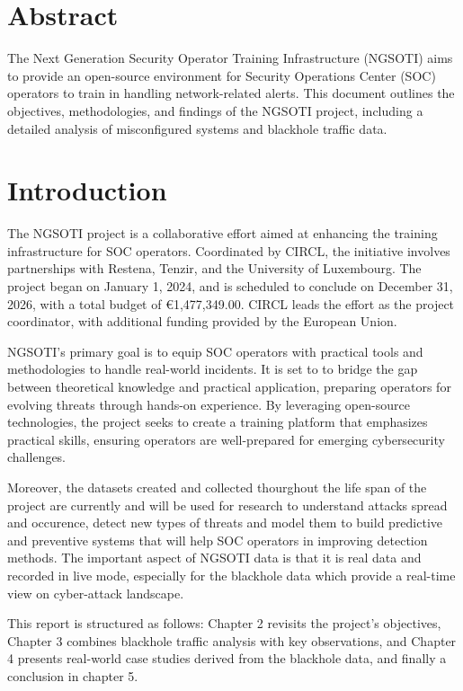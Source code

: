 \chapter*{Abstract}
The Next Generation Security Operator Training Infrastructure (NGSOTI) aims to provide an open-source environment for Security Operations Center (SOC) operators to train in handling network-related alerts. This document outlines the objectives, methodologies, and findings of the NGSOTI project, including a detailed analysis of misconfigured systems and blackhole traffic data.

\tableofcontents

\chapter{Introduction}
The NGSOTI project is a collaborative effort aimed at enhancing the training infrastructure for SOC operators. Coordinated by CIRCL, the initiative involves partnerships with Restena, Tenzir, and the University of Luxembourg. The project began on January 1, 2024, and is scheduled to conclude on December 31, 2026, with a total budget of €1,477,349.00. CIRCL leads the effort as the project coordinator, with additional funding provided by the European Union.

NGSOTI's primary goal is to equip SOC operators with practical tools and methodologies to handle real-world incidents. It is set to to bridge the gap between theoretical knowledge and practical application, preparing operators for evolving threats through hands-on experience. By leveraging open-source technologies, the project seeks to create a training platform that emphasizes practical skills, ensuring operators are well-prepared for emerging cybersecurity challenges.

{\color{red}Moreover, the datasets created and collected thourghout the life span of the project are currently and will be used for research to understand attacks spread and occurence, detect new types of threats and model them to build predictive and preventive systems that will help SOC operators in improving detection methods. The important aspect of NGSOTI data is that it is real data and recorded in live mode, especially for the blackhole data which provide a real-time view on cyber-attack landscape.}

{\color{red}This report is structured as follows: Chapter 2 revisits the project's objectives, Chapter 3 combines blackhole traffic analysis with key observations, and Chapter 4 presents real-world case studies derived from the blackhole data, and finally a conclusion in chapter 5.}


